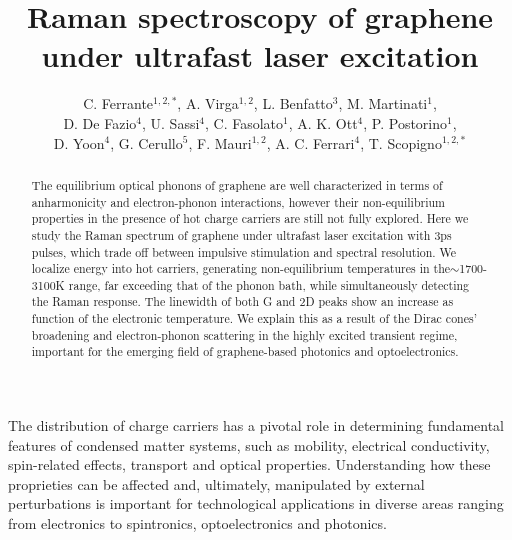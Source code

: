 \documentclass[aps, prl,twocolumn]{revtex4}
\begin{document}
\title{Raman spectroscopy of graphene under ultrafast laser excitation}
\author{C. Ferrante$^{1,2,*}$, A. Virga$^{1,2}$, L. Benfatto$^3$, M. Martinati$^1$,\\  D. De Fazio$^4$, U. Sassi$^4$, C. Fasolato$^1$, A. K. Ott$^4$, P. Postorino$^{1}$,\\ D. Yoon$^4$, G. Cerullo$^5$, F. Mauri$^{1,2}$, A. C. Ferrari$^4$, T. Scopigno$^{1,2,*}$}

\begin{abstract}
The equilibrium optical phonons of graphene are well characterized in terms of anharmonicity and electron-phonon interactions, however their non-equilibrium properties in the presence of hot charge carriers are still not fully explored. Here we study the Raman spectrum of graphene under ultrafast laser excitation with 3ps pulses, which trade off between impulsive stimulation and spectral resolution. We localize energy into hot carriers, generating non-equilibrium temperatures in the$\sim$1700-3100K range, far exceeding that of the phonon bath, while simultaneously detecting the Raman response. The linewidth of both G and 2D peaks show an increase as function of the electronic temperature. We explain this as a result of the Dirac cones' broadening and electron-phonon scattering in the highly excited transient regime, important for the emerging field of graphene-based photonics and optoelectronics.
\end{abstract}

\maketitle
The distribution of charge carriers has a pivotal role in determining fundamental features of condensed matter systems, such as mobility, electrical conductivity, spin-related effects, transport and optical properties. Understanding how these proprieties can be affected and, ultimately, manipulated by external perturbations is important for technological applications in diverse areas ranging from electronics to spintronics, optoelectronics and photonics\cite{Bonaccorso2010, Nanoscale2015, Koppens2014}.
\end{document}
